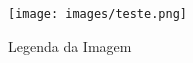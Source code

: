 \begin{figure}[!htb]
     \centering
     \texttt{[image: images/teste.png]}
     \caption{Legenda da Imagem}
     \label{Label de referência para a imagem}
\end{figure}
